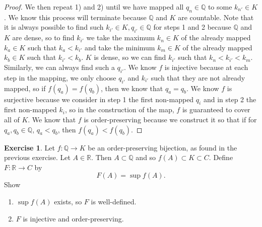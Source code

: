\documentclass[12pt]{article}
\newcommand{\bbQ}{\mathbb{Q}}
\newcommand{\bbR}{\mathbb{R}}
\renewcommand{\_}[1]{\underline{ #1 }}
\theoremstyle{definition}
\newtheorem{exercise}[theorem]{Exercise}
\numberwithin{equation}{subsection}
\begin{document}
\begin{proof}
We then repeat 1) and 2) until we have mapped all $q_n \in \bbQ$ to some $k_{n'} \in K$. We know this process will terminate because $\bbQ$ and $K$ are countable. \newline
Note that it is always possible to find such $k_{i'} \in K, q_{i'} \in \bbQ$ for steps 1 and 2 because $\bbQ$ and $K$ are dense, so to find $k_{i'}$ we take the maximum $k_n \in K$ of the already mapped $k_a \in K$ such that $k_a < k_{i'}$ and take the minimum $k_m \in K$ of the already mapped $k_b \in K$ such that $k_{i'} < k_b$. $K$ is dense, so we can find $k_{i'}$ such that $k_n < k_{i'} < k_m$. Similarly, we can always find such a $q_{i'}$. \newline
We know $f$ is injective because at each step in the mapping, we only choose $q_{i'}$ and $k_{i'}$ such that they are not already mapped, so if $f(q_a) = f(q_b)$, then we know that $q_a = q_b$. \newline
We know $f$ is surjective because we consider in step 1 the first non-mapped $q_i$ and in step 2 the first non-mapped $k_i$, so in the construction of the map, $f$ is guaranteed to cover all of $K$. \newline
We know that $f$ is order-preserving because we construct it so that if for $q_a, q_b \in \bbQ$, $q_a < q_b$, then $f(q_a) < f(q_b)$.

\end{proof}

\begin{exercise} Let $f:\bbQ\longrightarrow K$ be an order-preserving bijection, as found in the previous exercise. Let $A\in \bbR.$ Then $A\subset \bbQ$ and so $f(A)\subset K\subset C.$ Define
$F:\bbR\longrightarrow C$ by 
$$F(A)=\sup f(A).$$
Show
\begin{enumerate}
\item $\sup f(A)$ exists, so $F$ is well-defined.
\item $F$ is injective and order-preserving.
\end{enumerate}
\end{exercise}
\end{document}
